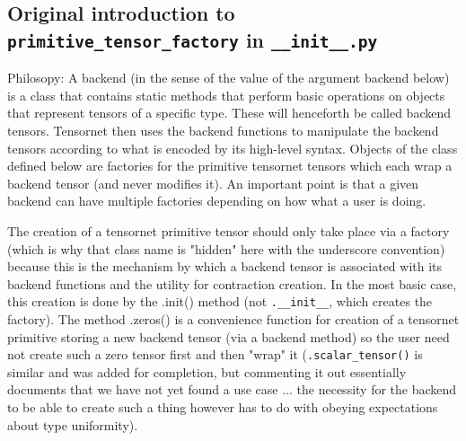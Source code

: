\documentclass[12pt,letterpaper]{article}
\begin{document}
	\subsection{Original introduction to \texttt{primitive\_tensor\_factory} in \texttt{\_\_init\_\_.py}}

Philosopy:  A backend (in the sense of the value of the argument backend below) is a class that
contains static methods that perform basic operations on objects that represent tensors of a specific
type. These will henceforth be called backend tensors.  Tensornet then uses the backend functions to
manipulate the backend tensors according to what is encoded by its high-level syntax.  Objects of the
class defined below are factories for the primitive tensornet tensors which each wrap a backend tensor
(and never modifies it).  An important point is that a given backend can have multiple factories
depending on how what a user is doing.

The creation of a tensornet primitive tensor should only take place via a factory (which is why
that class name is "hidden" here with the underscore convention) because this is the mechanism by
which a backend tensor is associated with its backend functions and the utility for contraction creation.
In the most basic case, this creation is done by the .init() method (not \texttt{.\_\_init\_\_}, which creates the 
factory).  The method .zeros() is a convenience function for creation of a tensornet primitive storing
a new backend tensor (via a backend method) so the user need not create such a zero tensor first and
then "wrap" it (\texttt{.scalar\_tensor()} is similar and was added for completion, but commenting it out essentially
documents that we have not yet found a use case ... the necessity for the backend to be able to create
such a thing however has to do with obeying expectations about type uniformity).
\end{document}

